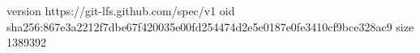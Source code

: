 version https://git-lfs.github.com/spec/v1
oid sha256:867e3a2212f7dbe67f420035e00fd254474d2e5e0187e0fe3410cf9bce328ac9
size 1389392
